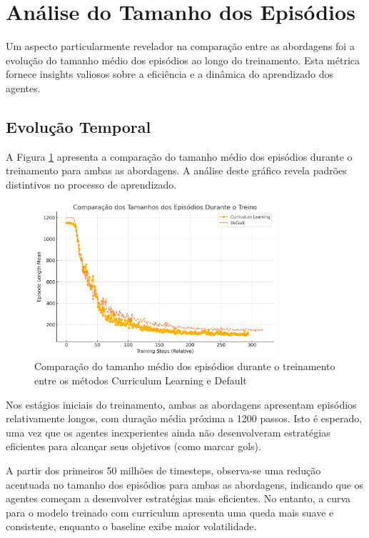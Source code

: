 \section{Análise do Tamanho dos Episódios}
\label{sec:analise_tamanho}

Um aspecto particularmente revelador na comparação entre as abordagens foi a evolução do tamanho médio dos episódios ao longo do treinamento. Esta métrica fornece insights valiosos sobre a eficiência e a dinâmica do aprendizado dos agentes.

\subsection{Evolução Temporal}

A Figura \ref{fig:tamanho_eps} apresenta a comparação do tamanho médio dos episódios durante o treinamento para ambas as abordagens. A análise deste gráfico revela padrões distintivos no processo de aprendizado.

\begin{figure}[H]
    \centering
    \includegraphics[width=0.8\textwidth]{fig/tamanho_eps.png}
    \caption{Comparação do tamanho médio dos episódios durante o treinamento entre os métodos Curriculum Learning e Default}
    \label{fig:tamanho_eps}
\end{figure}

Nos estágios iniciais do treinamento, ambas as abordagens apresentam episódios relativamente longos, com duração média próxima a 1200 passos. Isto é esperado, uma vez que os agentes inexperientes ainda não desenvolveram estratégias eficientes para alcançar seus objetivos (como marcar gols).

A partir dos primeiros 50 milhões de timesteps, observa-se uma redução acentuada no tamanho dos episódios para ambas as abordagens, indicando que os agentes começam a desenvolver estratégias mais eficientes. No entanto, a curva para o modelo treinado com curriculum apresenta uma queda mais suave e consistente, enquanto o baseline exibe maior volatilidade.

